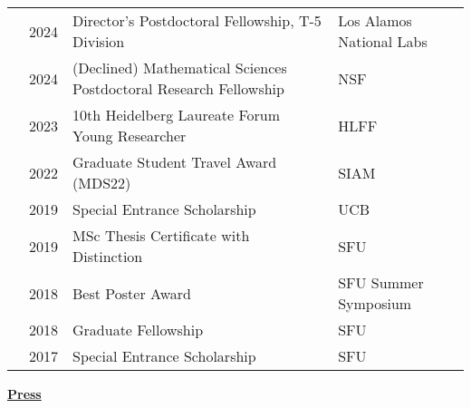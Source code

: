\documentclass[letterpaper,11pt,oneside]{article}
\newcommand{\headr}[1]{\vspace{10pt}\uline{\Large{\textbf{#1}} \hfill } \\ \vspace{-10pt}\\}
\begin{document}
\begin{tabular}{@{} p{0.00cm} p{1cm} p{9cm} p{8cm}}
& 2024 & Director's Postdoctoral Fellowship, T-5 Division & Los Alamos National Labs \\
& 2024 & (Declined) Mathematical Sciences Postdoctoral Research Fellowship & NSF \\
& 2023 & 10th Heidelberg Laureate Forum Young Researcher & HLFF \\
& 2022 & Graduate Student Travel Award (MDS22) & SIAM \\
& 2019 & Special Entrance Scholarship & UCB \\
& 2019 & MSc Thesis Certificate with Distinction & SFU \\
& 2018 & Best Poster Award & SFU Summer Symposium \\
& 2018 & Graduate Fellowship & SFU \\
& 2017 & Special Entrance Scholarship & SFU \\
\end{tabular}
\newpage
\headr{Press}
\vspace{-0.5cm}
\end{document}
